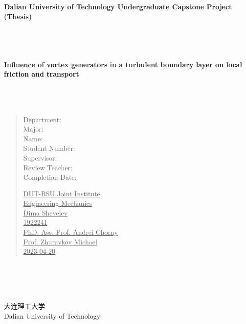 \documentclass[12pt, a4paper]{article}
\begin{document}
	\begin{titlepage}
		\begin{center}
			\LARGE{\textbf{Dalian University of Technology Undergraduate Capstone Project (Thesis)}}
			~~~
			\\
			~~~
			\\
			~~~
			\\
			~~~
			\\
			~~~
			\\
			\Large{\textbf{Influence of vortex generators in a turbulent boundary layer on local friction and transport}}
			~~~
			\\
			~~~
			\\
			~~~
			\\
			~~~
			\\
			\begin{verse}
			\begin{minipage}{0.3\textwidth}
				Department:\\  
				Major:\\
				Name:\\                 
				Student Number:\\                
				Supervisor:\\          
				Review Teacher:\\
				Completion Date:\\
			\end{minipage}
			\hfill
			\begin{minipage}{0.6\textwidth}
				\underline{\hspace{1cm}DUT-BSU Joint Institute\hspace{1.9cm}}\\   
				\underline{\hspace{1cm}Engineering Mechanics\hspace{2.15cm}}\\  
				\underline{\hspace{1cm}Dima Shevelev\hspace{3.85cm}}\\   
				\underline{\hspace{1cm}1922241\hspace{5.15cm}}\\
				\underline{\hspace{1cm}PhD. Ass. Prof. Andrei Chorny\hspace{0.5cm}}\\ 
				\underline{\hspace{1cm}Prof. Zhuravkov Michael\hspace{1.75cm}}\\
				\underline{\hspace{1cm}2023-04-20\hspace{4.55cm}}\\  
			\end{minipage}
			\end{verse}
			~~~
			\\
			~~~
			\\
			~~~
			\\
			~~~
			\\
			\Large{大连理工大学}
			~~~
			\\
			Dalian University of Technology
		\end{center}  
	\end{titlepage}
\end{document}

